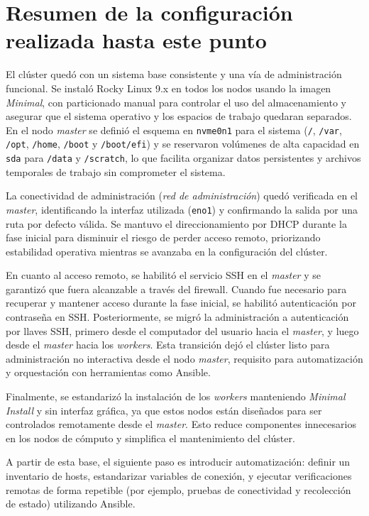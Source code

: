 \section{Resumen de la configuración realizada hasta este punto}
\label{sec:resumen_configuracion_hasta_ahora}

El clúster quedó con un sistema base consistente y una vía de administración funcional. Se instaló Rocky Linux 9.x en todos los nodos usando la imagen \textit{Minimal}, con particionado manual para controlar el uso del almacenamiento y asegurar que el sistema operativo y los espacios de trabajo quedaran separados. En el nodo \textit{master} se definió el esquema en \texttt{nvme0n1} para el sistema (\texttt{/}, \texttt{/var}, \texttt{/opt}, \texttt{/home}, \texttt{/boot} y \texttt{/boot/efi}) y se reservaron volúmenes de alta capacidad en \texttt{sda} para \texttt{/data} y \texttt{/scratch}, lo que facilita organizar datos persistentes y archivos temporales de trabajo sin comprometer el sistema.

La conectividad de administración (\textit{red de administración}) quedó verificada en el \textit{master}, identificando la interfaz utilizada (\texttt{eno1}) y confirmando la salida por una ruta por defecto válida. Se mantuvo el direccionamiento por DHCP durante la fase inicial para disminuir el riesgo de perder acceso remoto, priorizando estabilidad operativa mientras se avanzaba en la configuración del clúster.

En cuanto al acceso remoto, se habilitó el servicio SSH en el \textit{master} y se garantizó que fuera alcanzable a través del firewall. Cuando fue necesario para recuperar y mantener acceso durante la fase inicial, se habilitó autenticación por contraseña en SSH. Posteriormente, se migró la administración a autenticación por llaves SSH, primero desde el computador del usuario hacia el \textit{master}, y luego desde el \textit{master} hacia los \textit{workers}. Esta transición dejó el clúster listo para administración no interactiva desde el nodo \textit{master}, requisito para automatización y orquestación con herramientas como Ansible.

Finalmente, se estandarizó la instalación de los \textit{workers} manteniendo \textit{Minimal Install} y sin interfaz gráfica, ya que estos nodos están diseñados para ser controlados remotamente desde el \textit{master}. Esto reduce componentes innecesarios en los nodos de cómputo y simplifica el mantenimiento del clúster.

A partir de esta base, el siguiente paso es introducir automatización: definir un inventario de hosts, estandarizar variables de conexión, y ejecutar verificaciones remotas de forma repetible (por ejemplo, pruebas de conectividad y recolección de estado) utilizando Ansible.
